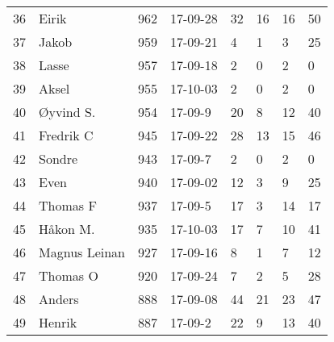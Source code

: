 \begin{longtable}{|r|l|r|l|l|l|l|l|}
36 &                Eirik &   962 &    17-09-28 &              32 &    16 &      16 &        50 \\
37 &                Jakob &   959 &    17-09-21 &               4 &     1 &       3 &        25 \\
38 &                Lasse &   957 &    17-09-18 &               2 &     0 &       2 &         0 \\
39 &                Aksel &   955 &    17-10-03 &               2 &     0 &       2 &         0 \\
40 &            Øyvind S. &   954 &     17-09-9 &              20 &     8 &      12 &        40 \\
41 &            Fredrik C &   945 &    17-09-22 &              28 &    13 &      15 &        46 \\
42 &               Sondre &   943 &     17-09-7 &               2 &     0 &       2 &         0 \\
43 &                 Even &   940 &    17-09-02 &              12 &     3 &       9 &        25 \\
44 &             Thomas F &   937 &     17-09-5 &              17 &     3 &      14 &        17 \\
45 &             Håkon M. &   935 &    17-10-03 &              17 &     7 &      10 &        41 \\
46 &        Magnus Leinan &   927 &    17-09-16 &               8 &     1 &       7 &        12 \\
47 &             Thomas O &   920 &    17-09-24 &               7 &     2 &       5 &        28 \\
48 &               Anders &   888 &    17-09-08 &              44 &    21 &      23 &        47 \\
49 &               Henrik &   887 &     17-09-2 &              22 &     9 &      13 &        40 \\
\end{longtable}
